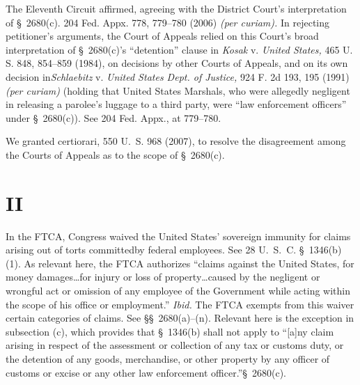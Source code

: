   The Eleventh Circuit affirmed, agreeing with the District Court's interpretation of \S~2680(c). 204 Fed. Appx. 778, 779--780 (2006) \emph{(per curiam).} In rejecting petitioner's arguments, the Court of Appeals relied on this Court's broad interpretation of \S~2680(c)'s ``detention'' clause in \emph{Kosak} v. \emph{United States,} 465 U. S. 848, 854--859 (1984), on decisions by other Courts of Appeals, and on its own decision in\emph{Schlaebitz} v. \emph{United States Dept. of Justice,} 924 F. 2d 193, 195 (1991) \emph{(per curiam)} (holding that United States Marshals, who were allegedly negligent in releasing a parolee's luggage to a third party, were ``law enforcement officers'' under \S~2680(c)). See 204 Fed. Appx., at 779--780.

  We granted certiorari, 550 U.~S. 968 (2007), to resolve the disagreement among the Courts of Appeals as to the scope of \S~2680(c).\footnotemark[1]

\section{II}

  In the FTCA, Congress waived the United States' sovereign immunity for claims arising out of torts committed\starpage  by federal employees. See 28 U.~S.~C. \S~1346(b)(1). As relevant here, the FTCA authorizes ``claims against the United States, for money damages\dots for injury or loss of property\dots caused by the negligent or wrongful act or omission of any employee of the Government while acting within the scope of his office or employment.'' \emph{Ibid.} The FTCA exempts from this waiver certain categories of claims. See \S\S~2680(a)--(n). Relevant here is the exception in subsection (c), which provides that \S~1346(b) shall not apply to ``[a]ny claim arising in respect of the assessment or collection of any tax or customs duty, or the detention of any goods, merchandise, or other property by any officer of customs or excise or any other law enforcement officer.''\S~2680(c).


